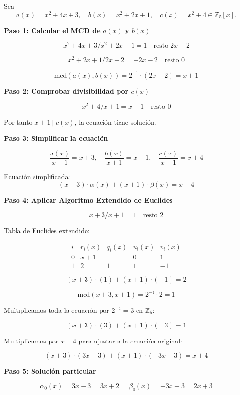 \documentclass[a4paper,12pt]{article}
\begin{document}
\begin{ejemplo}[title=Resolución de una ecuación diofántica en $\mathbb{Z}_5$]
Sea
\[
a(x) = x^2+4x+3, \quad b(x) = x^2+2x+1, \quad c(x) = x^2+4 \in \mathbb{Z}_5[x].
\]

\textbf{Paso 1: Calcular el MCD de \(a(x)\) y \(b(x)\)}

\[
x^2+4x+3 / x^2+2x+1 = 1 \quad \text{resto } \boxed{2x+2}
\]

\[
x^2+2x+1 / 2x+2 = -2x-2 \quad \text{resto } 0
\]

\[
\text{mcd}(a(x),b(x)) = 2^{-1} \cdot \boxed{(2x+2)} = x+1
\]

\textbf{Paso 2: Comprobar divisibilidad por \(c(x)\)}

\[
x^2+4 / x+1 = x-1 \quad \text{resto } 0
\]

Por tanto \(x+1 \mid c(x)\), la ecuación tiene solución.

\textbf{Paso 3: Simplificar la ecuación}

\[
\frac{a(x)}{x+1} = x+3, \quad \frac{b(x)}{x+1} = x+1, \quad \frac{c(x)}{x+1} = x+4
\]

Ecuación simplificada:
\[
(x+3)\cdot\alpha(x) + (x+1)\cdot\beta(x) = x+4
\]

\textbf{Paso 4: Aplicar Algoritmo Extendido de Euclides}

\[
x+3 / x+1 = 1 \quad \text{resto } \boxed{2}
\]

Tabla de Euclides extendido:

\[
\begin{array}{c|c|c|c|c}
i & r_i(x) & q_i(x) & u_i(x) & v_i(x) \\
\hline
0 & x+1 & - & 0 & 1 \\
1 & \boxed{2} & 1 & 1 & -1
\end{array}
\]

\[
(x+3)\cdot (1) + (x+1)\cdot(-1) = \boxed{2}
\]

\[
\text{mcd}(x+3,x+1) = 2^{-1} \cdot \boxed{2} = 1
\]

Multiplicamos toda la ecuación por \(2^{-1} = 3\) en \(\mathbb{Z}_5\):

\[
(x+3)\cdot (3) + (x+1)\cdot(-3) = 1
\]

Multiplicamos por \(x+4\) para ajustar a la ecuación original:

\[
(x+3)\cdot (3x-3) + (x+1)\cdot (-3x+3) = x+4
\]

\textbf{Paso 5: Solución particular}

\[
\alpha_0(x) = 3x-3 = 3x+2, \quad \beta_0(x) = -3x+3 = 2x+3
\]

\end{ejemplo}
\end{document}
